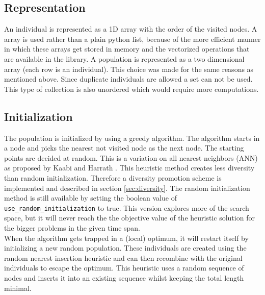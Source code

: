 \documentclass[a4paper,10pt]{article}
\newcommand{\ReplaceMe}[1]{{\color{blue}#1}}
\begin{document}

\subsection{Representation}


An individual is represented as a 1D  array with the order of the visited nodes. A  array is used rather than a plain python list, because of the more efficient manner in which these arrays get stored in memory and the vectorized operations that are available in the  library. A population is represented as a two dimensional array (each row is an individual). This choice was made for the same reasons as mentioned above. Since duplicate individuals are allowed a set can not be used. This type of collection is also unordered which would require more computations.

\subsection{Initialization}


The population is initialized by using a greedy algorithm. The algorithm starts in a node and picks the nearest not visited node as the next node. The starting points are decided at random. This is a variation on all nearest neighbors (ANN) as proposed by Kaabi and Harrath \cite{ann}. This heuristic method creates less diversity than random initialization. Therefore a diversity promotion scheme is implemented and described in section \ref{sec:diversity}. The random initialization method is still available by setting the boolean value of \texttt{use\_random\_initialization} to true. This version explores more of the search space, but it will never reach the the objective value of the heuristic solution for the bigger problems in the given time span.\\
When the algorithm gets trapped in a (local) optimum, it will restart itself by initializing a new random population. These individuals are created using the random nearest insertion heuristic \cite{rni} and can then recombine with the original individuals to escape the optimum. This heuristic uses a random sequence of nodes and inserts it into an existing sequence whilst keeping the total length minimal.
\end{document}
